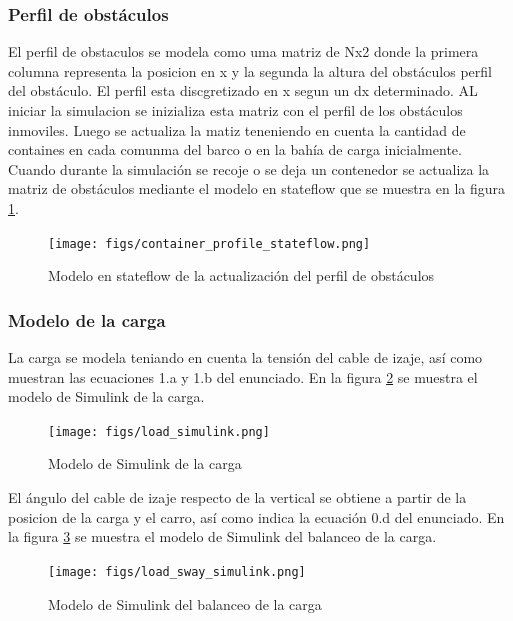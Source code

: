 \documentclass{article}
\begin{document}
        \subsubsection{Perfil de obstáculos}
        El perfil de obstaculos se modela como uma matriz de Nx2 donde la primera columna representa la posicion en x y la segunda la altura del obstáculos perfil del obstáculo. El perfil esta discgretizado en x segun un dx determinado. 
        AL iniciar la simulacion se inizializa esta matriz con el perfil de los obstáculos inmoviles. Luego se actualiza la matiz teneniendo en cuenta la cantidad de containes en cada comunma del barco o en la bahía de carga inicialmente.
        Cuando durante la simulación se recoje o se deja un contenedor se actualiza la matriz de obstáculos mediante el modelo en stateflow que se muestra en la figura \ref{fig:container_profile_stateflow}.
        \begin{figure} [H]
            \centering
            \texttt{[image: figs/container\_profile\_stateflow.png]}
            \caption{Modelo en stateflow de la actualización del perfil de obstáculos}
            \label{fig:container_profile_stateflow}
        \end{figure}

        \subsubsection{Modelo de la carga}
            
            La carga se modela teniando en cuenta la tensión del cable de izaje, así como muestran las ecuaciones 1.a y 1.b del enunciado. En la figura \ref{fig:load_simulink} se muestra el modelo de Simulink de la carga.

            \begin{figure} [H]
                \centering
                \texttt{[image: figs/load\_simulink.png]}
                \caption{Modelo de Simulink de la carga}
                \label{fig:load_simulink}
            \end{figure}

            El ángulo del cable de izaje respecto de la vertical se obtiene a partir de la posicion de la carga y el carro, así como indica la ecuación 0.d del enunciado. En la figura \ref{fig:load_sway_simulink} se muestra el modelo de Simulink del balanceo de la carga.

            \begin{figure} [H]
                \centering
                \texttt{[image: figs/load\_sway\_simulink.png]}
                \caption{Modelo de Simulink del balanceo de la carga}
                \label{fig:load_sway_simulink}
            \end{figure}
\end{document}
